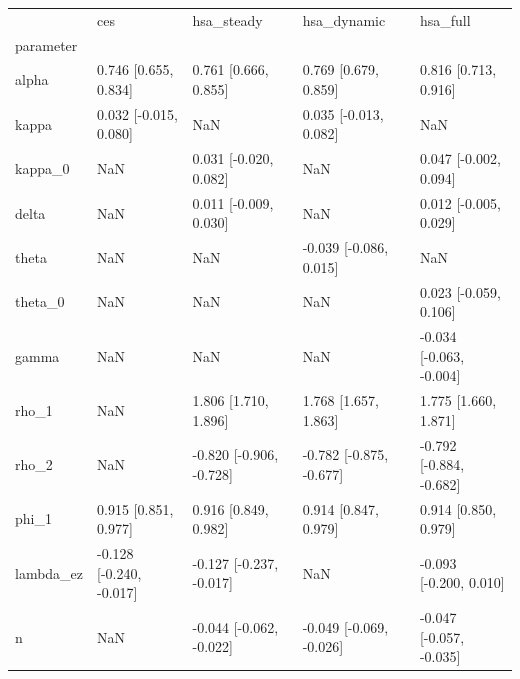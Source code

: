 \begin{tabular}{lllll}
\toprule
 & ces & hsa\_steady & hsa\_dynamic & hsa\_full \\
parameter &  &  &  &  \\
\midrule
alpha & 0.746 [0.655, 0.834] & 0.761 [0.666, 0.855] & 0.769 [0.679, 0.859] & 0.816 [0.713, 0.916] \\
kappa & 0.032 [-0.015, 0.080] & NaN & 0.035 [-0.013, 0.082] & NaN \\
kappa\_0 & NaN & 0.031 [-0.020, 0.082] & NaN & 0.047 [-0.002, 0.094] \\
delta & NaN & 0.011 [-0.009, 0.030] & NaN & 0.012 [-0.005, 0.029] \\
theta & NaN & NaN & -0.039 [-0.086, 0.015] & NaN \\
theta\_0 & NaN & NaN & NaN & 0.023 [-0.059, 0.106] \\
gamma & NaN & NaN & NaN & -0.034 [-0.063, -0.004] \\
rho\_1 & NaN & 1.806 [1.710, 1.896] & 1.768 [1.657, 1.863] & 1.775 [1.660, 1.871] \\
rho\_2 & NaN & -0.820 [-0.906, -0.728] & -0.782 [-0.875, -0.677] & -0.792 [-0.884, -0.682] \\
phi\_1 & 0.915 [0.851, 0.977] & 0.916 [0.849, 0.982] & 0.914 [0.847, 0.979] & 0.914 [0.850, 0.979] \\
lambda\_ez & -0.128 [-0.240, -0.017] & -0.127 [-0.237, -0.017] & NaN & -0.093 [-0.200, 0.010] \\
n & NaN & -0.044 [-0.062, -0.022] & -0.049 [-0.069, -0.026] & -0.047 [-0.057, -0.035] \\
\bottomrule
\end{tabular}
